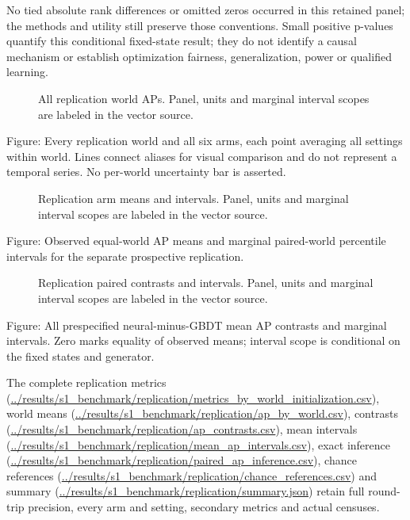 \documentclass{article}
\begin{document}
No tied absolute rank differences or omitted zeros occurred in this retained panel; the methods and utility still preserve those conventions. Small positive p-values quantify this conditional fixed-state result; they do not identify a causal mechanism or establish optimization fairness, generalization, power or qualified learning.

\begin{figure}[t]
\centering

\caption{All replication world APs. Panel, units and marginal interval scopes are labeled in the vector source.}
\end{figure}

Figure: Every replication world and all six arms, each point averaging all settings within world. Lines connect aliases for visual comparison and do not represent a temporal series. No per-world uncertainty bar is asserted.

\begin{figure}[t]
\centering

\caption{Replication arm means and intervals. Panel, units and marginal interval scopes are labeled in the vector source.}
\end{figure}

Figure: Observed equal-world AP means and marginal paired-world percentile intervals for the separate prospective replication.

\begin{figure}[t]
\centering

\caption{Replication paired contrasts and intervals. Panel, units and marginal interval scopes are labeled in the vector source.}
\end{figure}

Figure: All prespecified neural-minus-GBDT mean AP contrasts and marginal intervals. Zero marks equality of observed means; interval scope is conditional on the fixed states and generator.

The complete replication metrics (\url{../results/s1_benchmark/replication/metrics_by_world_initialization.csv}), world means (\url{../results/s1_benchmark/replication/ap_by_world.csv}), contrasts (\url{../results/s1_benchmark/replication/ap_contrasts.csv}), mean intervals (\url{../results/s1_benchmark/replication/mean_ap_intervals.csv}), exact inference (\url{../results/s1_benchmark/replication/paired_ap_inference.csv}), chance references (\url{../results/s1_benchmark/replication/chance_references.csv}) and summary (\url{../results/s1_benchmark/replication/summary.json}) retain full round-trip precision, every arm and setting, secondary metrics and actual censuses.
\end{document}
